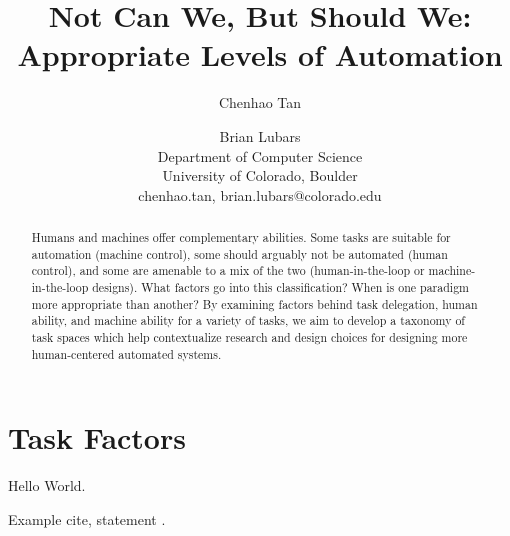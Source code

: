 \documentclass[letterpaper]{article} %
\begin{document}
%
\title{Not Can We, But Should We: \\Appropriate Levels of Automation}

\author{Chenhao Tan \and Brian Lubars\\
Department of Computer Science\\
University of Colorado, Boulder\\
{chenhao.tan, brian.lubars}@colorado.edu\\
}


\maketitle
\begin{abstract}
Humans and machines offer complementary abilities. Some tasks are suitable for automation (machine control), some should arguably not be automated (human control), and some are amenable to a mix of the two (human-in-the-loop or machine-in-the-loop designs). What factors go into this classification? When is one paradigm more appropriate than another? By examining factors behind task delegation, human ability, and machine ability for a variety of tasks, we aim to develop a taxonomy of task spaces which help contextualize research and design choices for designing more human-centered automated systems.
\end{abstract}

\section{Task Factors}
Hello World.

Example cite, statement \cite{lee}.




\end{document}
